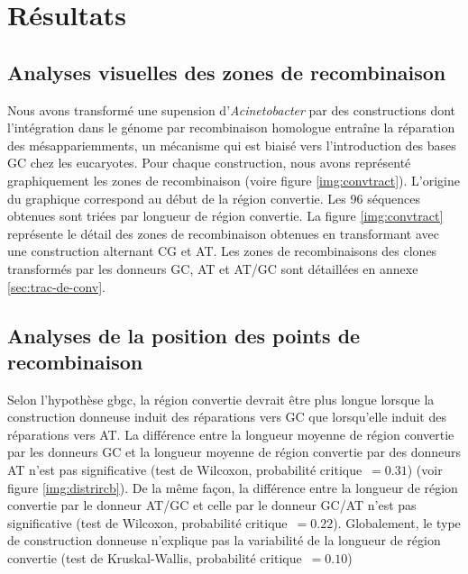 \section{Résultats}
\label{sec:resultats}


\subsection{Analyses visuelles des zones de recombinaison}
\label{subsec:visu}

Nous avons transformé une supension d'\emph{Acinetobacter} par des constructions
dont l'intégration dans le génome par recombinaison homologue entraîne la
réparation des mésappariemments, un mécanisme qui est biaisé vers l'introduction
des bases GC chez les eucaryotes. Pour chaque construction, nous avons
représenté graphiquement les zones de recombinaison (voire figure
\ref{img:convtract}). L'origine du graphique correspond au début de la région
convertie. Les 96 séquences obtenues sont triées par longueur de région
convertie. La figure \ref{img:convtract} représente le détail des zones de
recombinaison obtenues en transformant avec une construction alternant CG et AT.
Les zones de recombinaisons des clones transformés par les donneurs GC, AT et
AT/GC sont détaillées en annexe \ref{sec:trac-de-conv}.

\subsection{Analyses de la position des points de recombinaison}
\label{subsec:distribution-points}


Selon l'hypothèse \ac{gbgc}, la région convertie devrait être plus longue
lorsque la construction donneuse induit des réparations vers GC que lorsqu'elle
induit des réparations vers AT. La différence entre la longueur moyenne de
région convertie par les donneurs GC et la longueur moyenne de région convertie
par des donneurs AT n'est pas significative (test de Wilcoxon, probabilité
critique~\(= 0.31\)) (voir figure \ref{img:distrircb}). De la même façon, la
différence entre la longueur de région convertie par le donneur AT/GC et celle
par le donneur GC/AT n'est pas significative (test de Wilcoxon, probabilité
critique~\(= 0.22\)). Globalement, le type de construction donneuse n'explique
pas la variabilité de la longueur de région convertie (test de Kruskal-Wallis,
probabilité critique~\(=0.10\))

